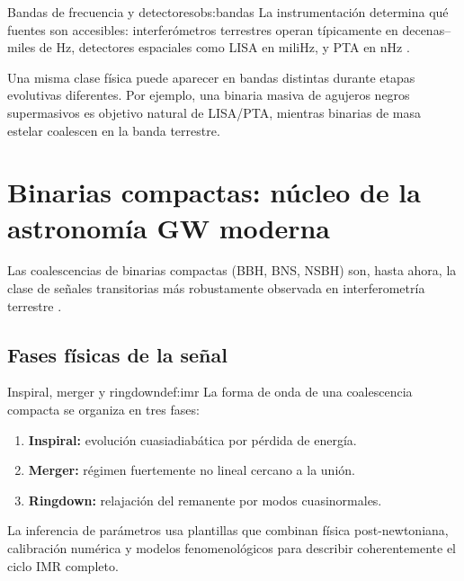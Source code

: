 \begin{observacion}{Bandas de frecuencia y detectores}{obs:bandas}
La instrumentación determina qué fuentes son accesibles: interferómetros terrestres operan típicamente en decenas--miles de Hz, detectores espaciales como LISA en miliHz, y PTA en nHz \cite{LIGO2015, Virgo2015, LISA2017, NANOGrav2023}.
\end{observacion}

Una misma clase física puede aparecer en bandas distintas durante etapas evolutivas diferentes. Por ejemplo, una binaria masiva de agujeros negros supermasivos es objetivo natural de LISA/PTA, mientras binarias de masa estelar coalescen en la banda terrestre.

\section{Binarias compactas: núcleo de la astronomía GW moderna}
\label{sec:binarias_compactas}

Las coalescencias de binarias compactas (BBH, BNS, NSBH) son, hasta ahora, la clase de señales transitorias más robustamente observada en interferometría terrestre \cite{Abbott2016prl, Abbott2017BNS, GWTC1, GWTC3}.

\subsection{Fases físicas de la señal}

\begin{definicion}{Inspiral, merger y ringdown}{def:imr}
La forma de onda de una coalescencia compacta se organiza en tres fases:
\begin{enumerate}[leftmargin=2em, label=\textbf{\arabic*.}]
  \item \textbf{Inspiral:} evolución cuasiadiabática por pérdida de energía.
  \item \textbf{Merger:} régimen fuertemente no lineal cercano a la unión.
  \item \textbf{Ringdown:} relajación del remanente por modos cuasinormales.
\end{enumerate}
\end{definicion}

\begin{importante}
La inferencia de parámetros usa plantillas que combinan física post-newtoniana, calibración numérica y modelos fenomenológicos para describir coherentemente el ciclo IMR completo.
\end{importante}

